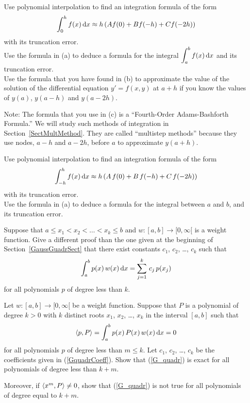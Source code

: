 \begin{question}
 Use polynomial interpolation to find an integration formula
of the form
\[
\int_0^h f(x)\,\mathrm{d}x \approx h\left(A f(0)+B f(-h)+C f(-2h)\right)
\]
with its truncation error.\\
 Use the formula in (a) to deduce a formula for the integral
$\displaystyle \int_a^b f(x)\,\mathrm{d}x$ and its truncation error.\\
 Use the formula that you have found in (b) to approximate the
value of the solution of the differential equation $y' = f(x,y)$ at
$a+h$ if you know the values of $y(a)$, $y(a-h)$ and $y(a-2h)$.

\noindent Note: The formula that you use in (c) is a ``Fourth-Order
Adams-Bashforth Formula.''  We will study such methods of integration in  
Section~\ref{SectMultMethod}.  They are called ``multistep methods''
because they use nodes, $a-h$ and $a-2h$, before $a$ to approximate
$y(a+h)$.
\label{diffQ22}
\end{question}

\begin{question}
 Use polynomial interpolation to find an integration formula
of the form
\[
\int_{-h}^h f(x)\,\mathrm{d}x \approx h\left(A\,f(0)+B\,f(-h)+C\,f(-2h)\right)
\]
with its truncation error.\\
 Use the formula in (a) to deduce a formula for the integral
between $a$ and $b$, and its truncation error.
\label{diffQ23}
\end{question}

\begin{question}
Suppose that $a \leq x_1 < x_2 < \ldots < x_k \leq b$ and
$w:[a,b]\to [0,\infty[$ is a weight function.   Give a different proof
than the one given at the beginning of Section~\ref{GaussGuadrSect} 
that there exist constants $c_1$, $c_2$, \ldots, $c_k$ such that
\begin{equation}\label{G_quadr}
\int_a^b p(x)\,w(x)\,\mathrm{d}x = \sum_{j=1}^k\,c_j\,p(x_j)
\end{equation}
for all polynomials $p$ of degree less than $k$.
\label{diffQ24}
\end{question}

\begin{question}
Let $w:[a,b] \rightarrow [0,\infty[$ be a weight function.  Suppose
that $P$ is a polynomial of degree $k>0$ with $k$ distinct roots
$x_1$, $x_2$, \ldots, $x_k$ in the interval $[a,b]$ such that
\[
  \left\langle{p} , {P}\right\rangle = \int_a^b p(x)\,P(x)\,w(x) \,\mathrm{d}x = 0
\]
for all polynomials $p$ of degree less than $m \leq k$.
Let $c_1$, $c_2$, \ldots, $c_k$ be the coefficients given in
(\ref{GquadrCoeff}).  Show that (\ref{G_quadr}) is
exact for all polynomials of degree less than $k+m$.

Moreover, if $\left\langle{x^m} , {P}\right\rangle \neq 0$, show that (\ref{G_quadr}) is
not true for all polynomials of degree equal to $k+m$.
\label{diffQ25}
\end{question}

